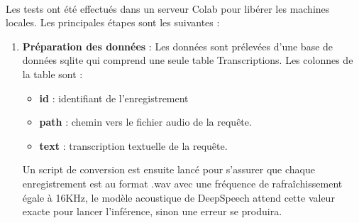 	\paragraph{}
	Les tests ont été effectués dans un serveur Colab pour libérer les machines locales. Les principales étapes sont les suivantes :  
	\begin{enumerate}
		\item \textbf{Préparation des données} : Les données sont prélevées d'une base de données sqlite qui comprend une seule table Transcriptions. Les colonnes de la table sont : 
		\begin{itemize}
			\item \textbf{id} : identifiant de l'enregistrement
			\item \textbf{path} : chemin vers le fichier audio de la requête.
			\item \textbf{text} : transcription textuelle de la requête.
		\end{itemize}
		\par
		Un script de conversion est ensuite lancé pour s'assurer que chaque enregistrement est au format .wav avec une fréquence de rafraîchissement égale à 16KHz, le modèle acoustique de DeepSpeech attend cette valeur exacte pour lancer l'inférence, sinon une erreur se produira.
		

\end{enumerate}
